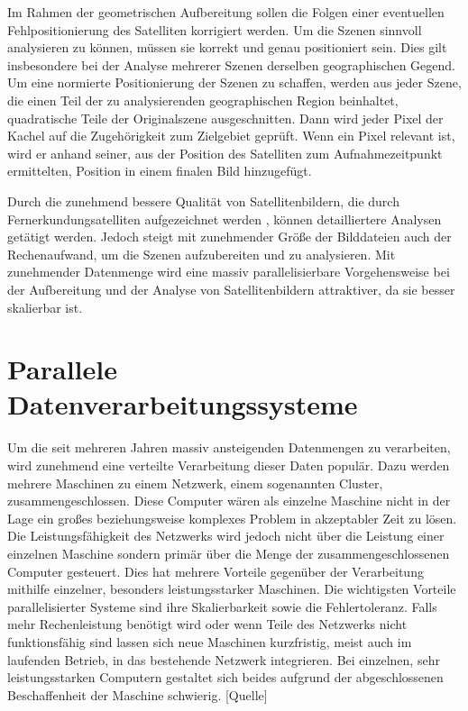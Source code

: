 Im Rahmen der geometrischen Aufbereitung sollen die Folgen einer eventuellen Fehlpositionierung des Satelliten korrigiert werden. Um die Szenen sinnvoll analysieren zu können, müssen sie korrekt und genau positioniert sein. Dies gilt insbesondere bei der Analyse mehrerer Szenen derselben geographischen Gegend. Um eine normierte Positionierung der Szenen zu schaffen, werden aus jeder Szene, die einen Teil der zu analysierenden geographischen Region beinhaltet, quadratische Teile der Originalszene ausgeschnitten. Dann wird jeder Pixel der Kachel auf die Zugehörigkeit zum Zielgebiet geprüft. Wenn ein Pixel relevant ist, wird er anhand seiner, aus der Position des Satelliten zum Aufnahmezeitpunkt ermittelten, Position in einem finalen Bild hinzugefügt. 


 
Durch die zunehmend bessere Qualität von Satellitenbildern, die durch Fernerkundungsatelliten aufgezeichnet werden \cite{Markham2004}, können detailliertere Analysen getätigt werden. Jedoch steigt mit zunehmender Größe der Bilddateien auch der Rechenaufwand, um die Szenen aufzubereiten und zu analysieren. Mit zunehmender Datenmenge wird eine massiv parallelisierbare Vorgehensweise bei der Aufbereitung und der Analyse von Satellitenbildern attraktiver, da sie besser skalierbar ist.


\section{Parallele Datenverarbeitungssysteme}
Um die seit mehreren Jahren massiv ansteigenden Datenmengen \cite{EMC2014} zu verarbeiten, wird zunehmend eine verteilte Verarbeitung dieser Daten populär. Dazu werden mehrere Maschinen zu einem Netzwerk, einem sogenannten Cluster, zusammengeschlossen. Diese Computer wären als einzelne Maschine nicht in der Lage ein großes beziehungsweise komplexes Problem in akzeptabler Zeit zu lösen. Die Leistungsfähigkeit des Netzwerks wird jedoch nicht über die Leistung einer einzelnen Maschine sondern primär über die Menge der zusammengeschlossenen Computer gesteuert. Dies hat mehrere Vorteile gegenüber der Verarbeitung mithilfe einzelner, besonders leistungsstarker Maschinen. Die wichtigsten Vorteile parallelisierter Systeme sind ihre Skalierbarkeit sowie die Fehlertoleranz. Falls mehr Rechenleistung benötigt wird oder wenn Teile des Netzwerks nicht funktionsfähig sind lassen sich neue Maschinen kurzfristig, meist auch im laufenden Betrieb, in das bestehende Netzwerk integrieren. Bei einzelnen, sehr leistungsstarken Computern gestaltet sich beides aufgrund der abgeschlossenen Beschaffenheit der Maschine schwierig. [Quelle]

